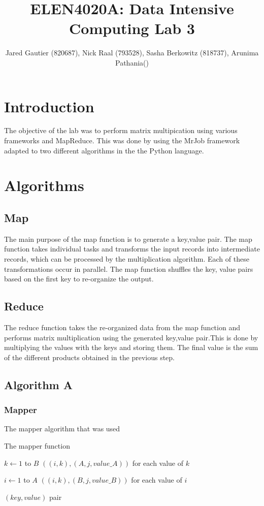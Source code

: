 \documentclass[twocolumn]{IEEEtran}
\title{ELEN4020A: Data Intensive Computing Lab 3}
\author{Jared Gautier (820687), Nick Raal (793528), Sasha Berkowitz (818737), Arunima Pathania()}
\begin{document}
	\maketitle
	
	\section{Introduction}
	The objective of the lab was to perform matrix multipication using various frameworks and MapReduce. This was done by using the MrJob framework adapted to two different algorithms in the the Python language.
	
	
	\section{Algorithms}
	\subsection{Map}
	The main purpose of the map function is to generate a key,value pair.  The map function takes individual tasks and transforms the input records into intermediate records, which can be processed by the multiplication algorithm. Each of these transformations occur in parallel. The map function shuffles the key, value pairs based on the first key to re-organize the output. 
	
	
	
	\subsection{Reduce}
	The reduce function takes the re-organized data from the map function and performs matrix multiplication using the generated key,value pair.This is done by multiplying the values with the keys and storing them. The final value is the sum of the different products obtained in the previous step.
	
	
	\subsection{Algorithm A}
	
	
	\subsubsection{Mapper}
	The mapper algorithm that was used 
	
	\begin{algorithm}
		\caption{The mapper function}
		\begin{algorithmic} 
			\STATE
			
			\STATE $k \leftarrow 1$ to $ B $
			\STATE $((i,k), (A, j, value\_ A))$ for each value of $k$
			\ENDFOR
			
			\STATE $i \leftarrow 1$ to $ A $
			\STATE $((i,k), (B, j, value\_ B))$ for each value of $i$
			
			\ENDFOR		
			
			
			\RETURN $(key, value)$ pair
			\end{algorithmic}
			\end{algorithm}
			
\end{document}
